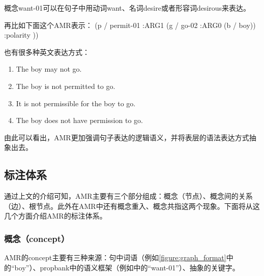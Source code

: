 \documentclass[master, winfont]{njuthesis}
\begin{document}
概念want-01可以在句子中用动词want、名词desire或者形容词desirous来表达。

再比如下面这个AMR表示：
(p / permit-01
     :ARG1 (g / go-02
              :ARG0 (b / boy))
     :polarity ))

也有很多种英文表达方式：
\begin{enumerate}
  \item The boy may not go.
  \item The boy is not permitted to go.
  \item It is not permissible for the boy to go.
  \item The boy does not have permission to go.
\end{enumerate}

由此可以看出，AMR更加强调句子表达的逻辑语义，并将表层的语法表达方式抽象出去。

\subsection{标注体系}
通过上文的介绍可知，AMR主要有三个部分组成：概念（节点）、概念间的关系（边）、根节点。此外在AMR中还有概念重入、概念共指这两个现象。下面将从这几个方面介绍AMR的标注体系。

\subsubsection{概念（concept）}

AMR的concept主要有三种来源：句中词语（例如\ref{figure:graph_format}中的“boy”）、propbank中的语义框架（例如\label{figure:graph_format}中的“want-01”）、抽象的关键字。
\end{document}
